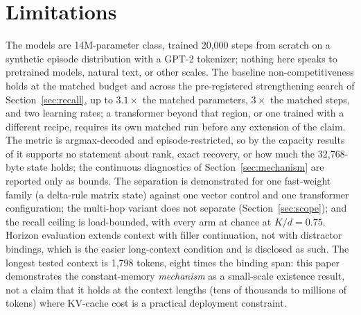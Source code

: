 \section{Limitations}
\label{sec:limitations}

The models are
14M-parameter class, trained 20{,}000 steps from scratch on a synthetic
episode distribution with a GPT-2 tokenizer; nothing here speaks to
pretrained models, natural text, or other scales. The baseline
non-competitiveness holds at the matched budget and across the
pre-registered strengthening search of Section~\ref{sec:recall}, up to
$3.1\times$ the matched parameters, $3\times$ the matched steps, and two
learning rates; %
a transformer beyond that region, or one trained with a different
recipe, requires its own matched run before any extension of the claim. The metric is argmax-decoded and
episode-restricted, so by the capacity results of
\citet{nichani2024understanding} it supports no statement about rank,
exact recovery, or how much the 32{,}768-byte state holds; the continuous
diagnostics of Section~\ref{sec:mechanism} are reported only as
bounds. The separation is demonstrated for one fast-weight family (a
delta-rule matrix state) against one vector control and one transformer
configuration; the multi-hop variant does not separate
(Section~\ref{sec:scope}); and the recall ceiling is load-bounded, with
every arm at chance at $K/d = 0.75$. Horizon evaluation extends context
with filler continuation, not with distractor bindings, which is the
easier long-context condition and is disclosed as such. The longest
tested context is 1{,}798 tokens, eight times the binding
span: %
this paper demonstrates the constant-memory \emph{mechanism} as a
small-scale existence result, not a claim that it holds at the context
lengths (tens of thousands to millions of tokens) where KV-cache cost is
a practical deployment constraint.
